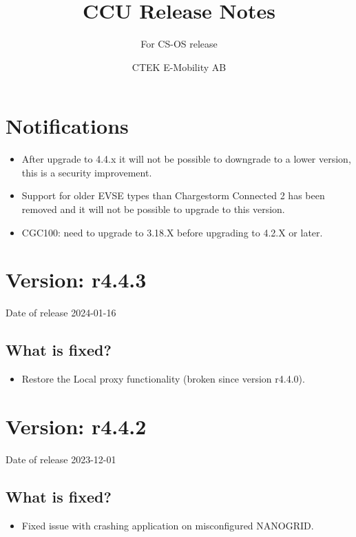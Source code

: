 \documentclass{scrartcl}
\title{CCU Release Notes}
\subtitle{For CS-OS release  }
\author{CTEK E-Mobility AB}
\begin{document}
\maketitle
\tableofcontents

\newcommand{\nanogrid}{NANOGRID\texttrademark}

\section{Notifications}
\label{sec:notifications}

\begin{itemize}
\item After upgrade to 4.4.x it will not be possible to downgrade to a lower version,
this is a security improvement.
\item Support for older EVSE types than Chargestorm Connected 2 has been removed and it will
not be possible to upgrade to this version.
\item CGC100: need to upgrade to 3.18.X before upgrading to 4.2.X or later.
\end{itemize}


\section{Version: r4.4.3}
Date of release 2024-01-16

\subsection*{What is fixed?}

\begin{itemize}
  \item Restore the Local proxy functionality (broken since version r4.4.0).
\end{itemize}


\section{Version: r4.4.2}
Date of release 2023-12-01

\subsection*{What is fixed?}

\begin{itemize}
  \item Fixed issue with crashing application on misconfigured \nanogrid.
\end{itemize}
\end{document}
